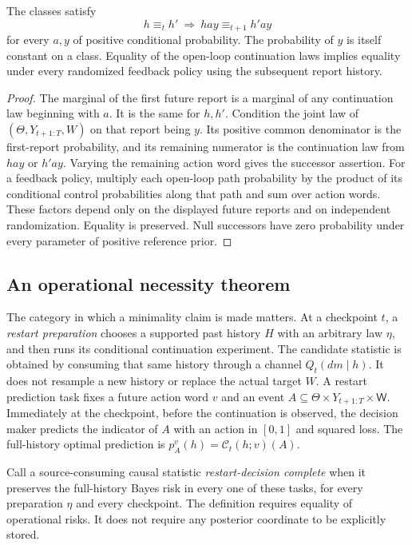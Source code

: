 \begin{lemma}\label{lem:v10-continuation}
The classes satisfy
\[
 h\equiv_t h'\ \Longrightarrow\
 hay\equiv_{t+1}h'ay
\]
for every $a,y$ of positive conditional probability. The probability
of $y$ is itself constant on a class. Equality of the open-loop
continuation laws implies equality under every randomized feedback
policy using the subsequent report history.
\end{lemma}
\begin{proof}
The marginal of the first future report is a marginal of any
continuation law beginning with $a$. It is the same for $h,h'$.
Condition the joint law of $(\Theta,Y_{t+1:T},W)$ on that report
being $y$. Its positive common denominator is the first-report
probability, and its remaining numerator is the continuation law
from $hay$ or $h'ay$. Varying the remaining action word gives the
successor assertion. For a feedback policy, multiply each open-loop
path probability by the product of its conditional control
probabilities along that path and sum over action words. These
factors depend only on the displayed future reports and on independent
randomization. Equality is preserved. Null successors have zero
probability under every parameter of positive reference prior.
\end{proof}

\subsection{An operational necessity theorem}
The category in which a minimality claim is made matters. At a
checkpoint $t$, a \emph{restart preparation} chooses a supported past
history $H$ with an arbitrary law $\eta$, and then runs its conditional
continuation experiment. The candidate statistic is obtained by
consuming that same history through a channel $Q_t(dm\mid h)$.
It does not resample a new history or replace the actual target $W$.
A restart prediction task fixes a future action word $v$ and an event
$A\subseteq\Theta\times Y_{t+1:T}\times\mathsf W$. Immediately at the
checkpoint, before the continuation is observed, the decision maker
predicts the indicator of $A$ with an action in $[0,1]$ and squared
loss. The full-history optimal prediction is
$p_A^v(h)=\mathcal C_t(h;v)(A)$.

Call a source-consuming causal statistic \emph{restart-decision
complete} when it preserves the full-history Bayes risk in every one
of these tasks, for every preparation $\eta$ and every checkpoint.
The definition requires equality of operational risks. It does not
require any posterior coordinate to be explicitly stored.

